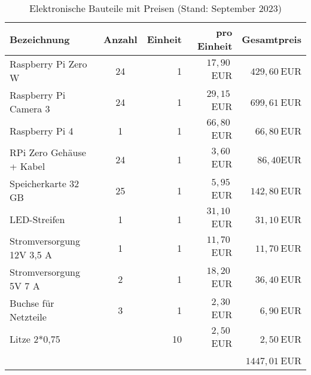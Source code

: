 \documentclass[./00_PhotoBox.tex]{subfiles}
\begin{document}
\begin{table}[ht]
    \centering
    \begin{tabular}{l|c|r|r|r}
        Bezeichnung               & Anzahl & Einheit & pro Einheit & Gesamtpreis   \\
        \hline
        Raspberry Pi Zero W       & 24     & 1       & $17,90~$EUR & $429,60~$EUR  \\
        Raspberry Pi Camera 3     & 24     & 1       & $29,15~$EUR & $699,61~$EUR  \\
        Raspberry Pi 4            & 1      & 1       & $66,80~$EUR & $66,80~$EUR   \\
        RPi Zero Gehäuse + Kabel  & 24     & 1       & $3,60~$EUR  & $86,40$EUR    \\
        Speicherkarte 32 GB       & 25     & 1       & $5,95~$EUR  & $142,80~$EUR  \\
        LED-Streifen              & 1      & 1       & $31,10~$EUR & $31,10~$EUR   \\
        Stromversorgung 12V 3,5 A & 1      & 1       & $11,70~$EUR & $11,70~$EUR   \\
        Stromversorgung 5V 7 A    & 2      & 1       & $18,20~$EUR & $36,40~$EUR   \\
        Buchse für Netzteile      & 3      & 1       & $2,30~$EUR  & $6,90~$EUR    \\
        Litze 2*0,75              &        & 10      & $2,50~$EUR  & $2,50~$EUR    \\
                                  &        &         &             & $1447,01~$EUR \\
    \end{tabular}
    \caption{Elektronische Bauteile mit Preisen (Stand: September 2023)}
    \label{tab:bauteile_elektronisch}
\end{table}
\end{document}
